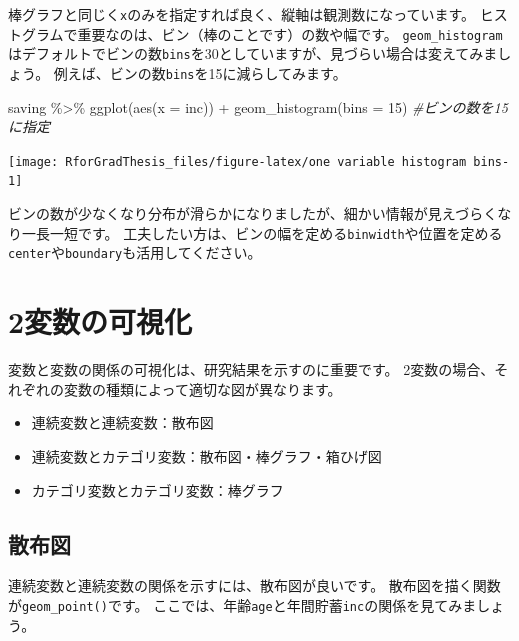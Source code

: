 \documentclass[
]{book}
\newenvironment{Shaded}{\begin{snugshade}}{\end{snugshade}}
\newcommand{\AttributeTok}[1]{\textcolor[rgb]{0.77,0.63,0.00}{#1}}
\newcommand{\CommentTok}[1]{\textcolor[rgb]{0.56,0.35,0.01}{\textit{#1}}}
\newcommand{\DecValTok}[1]{\textcolor[rgb]{0.00,0.00,0.81}{#1}}
\newcommand{\FunctionTok}[1]{\textcolor[rgb]{0.00,0.00,0.00}{#1}}
\newcommand{\NormalTok}[1]{#1}
\newcommand{\SpecialCharTok}[1]{\textcolor[rgb]{0.00,0.00,0.00}{#1}}
\providecommand{\tightlist}{%
  \setlength{\itemsep}{0pt}\setlength{\parskip}{0pt}}
\begin{document}
棒グラフと同じく\texttt{x}のみを指定すれば良く、縦軸は観測数になっています。
ヒストグラムで重要なのは、ビン（棒のことです）の数や幅です。
\texttt{geom\_histogram}はデフォルトでビンの数\texttt{bins}を30としていますが、見づらい場合は変えてみましょう。
例えば、ビンの数\texttt{bins}を15に減らしてみます。

\begin{Shaded}
\begin{Highlighting}[]
\NormalTok{saving }\SpecialCharTok{\%\textgreater{}\%}
  \FunctionTok{ggplot}\NormalTok{(}\FunctionTok{aes}\NormalTok{(}\AttributeTok{x =}\NormalTok{ inc)) }\SpecialCharTok{+}
  \FunctionTok{geom\_histogram}\NormalTok{(}\AttributeTok{bins =} \DecValTok{15}\NormalTok{) }\CommentTok{\#ビンの数を15に指定}
\end{Highlighting}
\end{Shaded}

\begin{center}\texttt{[image: RforGradThesis\_files/figure-latex/one variable histogram bins-1]} \end{center}

ビンの数が少なくなり分布が滑らかになりましたが、細かい情報が見えづらくなり一長一短です。
工夫したい方は、ビンの幅を定める\texttt{binwidth}や位置を定める\texttt{center}や\texttt{boundary}も活用してください。

\hypertarget{ux5909ux6570ux306eux53efux8996ux5316-1}{%
\section{2変数の可視化}\label{ux5909ux6570ux306eux53efux8996ux5316-1}}

変数と変数の関係の可視化は、研究結果を示すのに重要です。
2変数の場合、それぞれの変数の種類によって適切な図が異なります。

\begin{itemize}
\tightlist
\item
  連続変数と連続変数：散布図
\item
  連続変数とカテゴリ変数：散布図・棒グラフ・箱ひげ図
\item
  カテゴリ変数とカテゴリ変数：棒グラフ
\end{itemize}

\hypertarget{ux6563ux5e03ux56f3}{%
\subsection{散布図}\label{ux6563ux5e03ux56f3}}

連続変数と連続変数の関係を示すには、散布図が良いです。
散布図を描く関数が\texttt{geom\_point()}です。
ここでは、年齢\texttt{age}と年間貯蓄\texttt{inc}の関係を見てみましょう。
\end{document}
